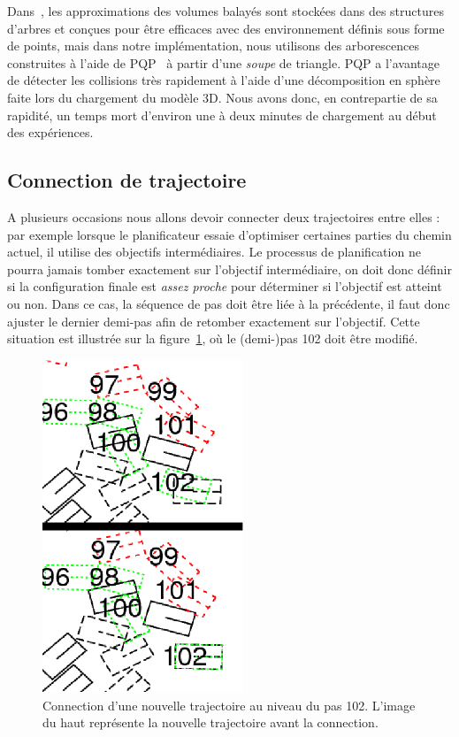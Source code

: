 Dans~\cite{perrin:TRO:2011}, les approximations des volumes balayés sont stockées dans des structures d'arbres et conçues pour être efficaces avec des environnement définis sous forme de points, mais dans notre implémentation, nous utilisons des arborescences construites à l'aide de PQP~\cite{Larsen:ICRA:2000} à partir d'une \emph{soupe} de triangle.
PQP a l'avantage de détecter les collisions très rapidement à l'aide d'une décomposition en sphère faite lors du chargement du modèle 3D. Nous avons donc, en contrepartie de sa rapidité, un temps mort d'environ une à deux minutes de chargement au début des expériences.


\subsection{Connection de trajectoire}
\label{sub:connection}

A plusieurs occasions nous allons devoir connecter deux trajectoires entre elles : par exemple lorsque le planificateur essaie d'optimiser certaines parties du chemin actuel, il utilise des objectifs intermédiaires. 
Le processus de planification ne pourra jamais tomber exactement sur l'objectif intermédiaire, on doit donc définir si la configuration finale est \emph{assez proche} pour déterminer si l'objectif est atteint ou non.
Dans ce cas, la séquence de pas doit être liée à la précédente, il faut donc ajuster le dernier demi-pas afin de retomber exactement sur l'objectif.
 Cette situation est illustrée sur la figure~\ref{fig:connection}, où le (demi-)pas 102 doit être modifié. 

\begin{figure}[h]
\begin{center}
\includegraphics[width=6.0cm]{images/connection.png}
\caption{Connection d'une nouvelle trajectoire au niveau du pas 102. L'image du haut représente la nouvelle trajectoire avant la connection.}
\label{fig:connection}
\end{center}
\end{figure}



